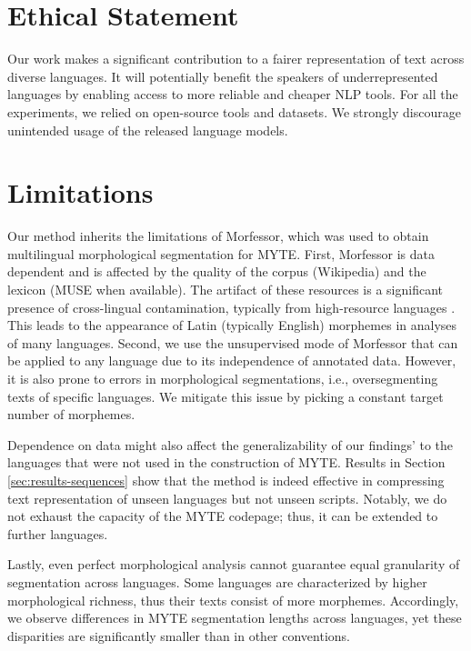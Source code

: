\section*{Ethical Statement} Our work makes a significant contribution to a fairer representation of text across diverse languages. It will potentially benefit the speakers of underrepresented languages by enabling access to more reliable and cheaper NLP tools. For all the experiments, we relied on open-source tools and datasets. We strongly discourage unintended usage of the released language models.

\section*{Limitations}

Our method inherits the limitations of Morfessor, which was used to obtain multilingual morphological segmentation for \textsc{MYTE}.
First, Morfessor is data dependent and is affected by the quality of the corpus (Wikipedia) and the lexicon (MUSE \citet{conneau_word_2017} when available). The artifact of these resources is a significant presence of cross-lingual contamination, typically from high-resource languages \cite{blevins-zettlemoyer-2022-language}. This leads to the appearance of Latin (typically English) morphemes in analyses of many languages. Second, we use the unsupervised mode of Morfessor that can be applied to any language due to its independence of annotated data. However, it is also prone to errors in morphological segmentations, i.e., oversegmenting texts of specific languages. We mitigate this issue by picking a constant target number of morphemes.

Dependence on data might also affect the generalizability of our findings' to the languages that were not used in the construction of \textsc{MYTE}. Results in Section \ref{sec:results-sequences} show that the method is indeed effective in compressing text representation of unseen languages but not unseen scripts. Notably, we do not exhaust the capacity of the \textsc{MYTE} codepage; thus, it can be extended to further languages. 

Lastly, even perfect morphological analysis cannot guarantee equal granularity of segmentation across languages. Some languages are characterized by higher morphological richness, thus their texts consist of more morphemes. Accordingly, we observe differences in \textsc{MYTE} segmentation lengths across languages, yet these disparities are significantly smaller than in other conventions.


